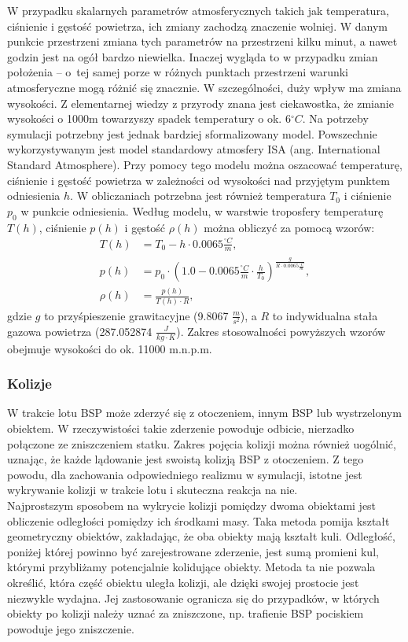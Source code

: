 W przypadku skalarnych parametrów atmosferycznych takich jak temperatura, ciśnienie i gęstość powietrza, ich zmiany zachodzą znaczenie wolniej. W danym punkcie przestrzeni zmiana tych parametrów na przestrzeni kilku minut, a nawet godzin jest na ogół bardzo niewielka. Inaczej wygląda to w przypadku zmian położenia -- o~tej samej porze w różnych punktach przestrzeni warunki atmosferyczne mogą różnić się znacznie. W szczególności, duży wpływ ma zmiana wysokości. Z elementarnej wiedzy z przyrody znana jest ciekawostka, że zmianie wysokości o 1000m towarzyszy spadek temperatury o ok. 6$^{\circ}C$. Na potrzeby symulacji potrzebny jest jednak bardziej sformalizowany model. Powszechnie wykorzystywanym jest model standardowy atmosfery ISA (ang. International Standard Atmosphere). Przy pomocy tego modelu można oszacować temperaturę, ciśnienie i gęstość powietrza w zależności od wysokości nad przyjętym punktem odniesienia $h$. W obliczaniach potrzebna jest również temperatura $T_0$ i ciśnienie $p_0$ w punkcie odniesienia. Według modelu, w warstwie troposfery temperaturę $T(h)$, ciśnienie $p(h)$ i gęstość $\rho(h)$ można obliczyć za pomocą wzorów:
\[
	\begin{aligned}
	T(h) & = T_0 - h \cdot 0.0065 \frac{^\circ C}{m},\\
	p(h) & = p_0 \cdot \left(1.0 - 0.0065 \frac{^\circ C}{m} \cdot \frac{h}{T_0} \right)^{\frac{g}{R \cdot  0.0065 \frac{^\circ C}{m}}},\\
	\rho(h) &  = \frac{p(h)}{T(h) \cdot R},
	\end{aligned}
\]
gdzie $g$ to przyśpieszenie grawitacyjne (9.8067 $\frac{m}{s^2}$), a $R$ to indywidualna stała gazowa powietrza (287.052874  $\frac{J}{kg \cdot K}$). Zakres stosowalności powyższych wzorów obejmuje wysokości do ok. 11000 m.n.p.m.

\subsubsection{Kolizje}

W trakcie lotu BSP może zderzyć się z otoczeniem, innym BSP lub wystrzelonym obiektem. W rzeczywistości takie zderzenie powoduje odbicie, nierzadko połączone ze zniszczeniem statku. Zakres pojęcia kolizji można również uogólnić, uznając, że każde lądowanie jest swoistą kolizją BSP z otoczeniem. Z tego powodu, dla zachowania odpowiedniego realizmu w symulacji, istotne jest wykrywanie kolizji w trakcie lotu i skuteczna reakcja na nie.\\

Najprostszym sposobem na wykrycie kolizji pomiędzy dwoma obiektami jest obliczenie odległości pomiędzy ich środkami masy. Taka metoda pomija kształt geometryczny obiektów, zakładając, że oba obiekty mają kształt kuli. Odległość, poniżej której powinno być zarejestrowane zderzenie, jest sumą promieni kul, którymi przybliżamy potencjalnie kolidujące obiekty. Metoda ta nie pozwala określić, która część obiektu uległa kolizji, ale dzięki swojej prostocie jest niezwykle wydajna. Jej zastosowanie ogranicza się do przypadków, w których obiekty po kolizji należy uznać za zniszczone, np. trafienie BSP pociskiem powoduje jego zniszczenie.\\

